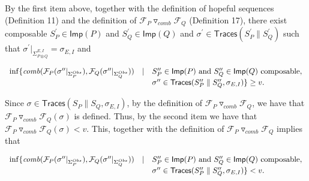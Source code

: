  
  
By the first item above, together with the definition of hopeful sequences (Definition 11) and the definition of ${{\mathcal{F}_{P}}\mathbin{\triangledown_{\mathit{comb}}}{\mathcal{F}_{Q}}}$ (Definition 17), there exist composable $S_{P}^{\prime}\in\mathsf{Imp}(P)$ and $S_{Q}^{\prime}\in\mathsf{Imp}(Q)$ and $\sigma^{\prime}\in\mathsf{Traces}(S_{P}^{\prime}\parallel S_{Q}^{\prime})$ such that $\sigma^{\prime}|_{\Sigma_{P\otimes Q}^{E,I}}=\sigma_{E,I}$ and\par
  
\par  \quad  \[\begin{array}[]{lll}\inf\{\mathit{comb}(\mathcal{F}_{P}(\sigma^{\prime\prime}|_{\Sigma_{P}^{Obs}}),\mathcal{F}_{Q}(\sigma^{\prime\prime}|_{\Sigma_{Q}^{Obs}}))&\mid&S_{P}^{\prime\prime}\in\mathsf{Imp}(P)\text{ and }S_{Q}^{\prime\prime}\in\mathsf{Imp}(Q)\text{ composable},\\
&&\sigma^{\prime\prime}\in\mathsf{Traces}(S_{P}^{\prime\prime}\parallel S_{Q}^{\prime\prime},\sigma_{E,I})\}\geq v.\end{array}\]\quad  \quad  
  
 
 
Since $\sigma\in\mathsf{Traces}(S_{P}\parallel S_{Q},\sigma_{E,I})$, by the definition of ${{\mathcal{F}_{P}}\mathbin{\triangledown_{\mathit{comb}}}{\mathcal{F}_{Q}}}$, we have that ${{\mathcal{F}_{P}}\mathbin{\triangledown_{\mathit{comb}}}{\mathcal{F}_{Q}}}(\sigma)$ is defined. Thus, by the second item we have that ${{\mathcal{F}_{P}}\mathbin{\triangledown_{\mathit{comb}}}{\mathcal{F}_{Q}}}(\sigma)<v$. This, together with the definition of ${{\mathcal{F}_{P}}\mathbin{\triangledown_{\mathit{comb}}}{\mathcal{F}_{Q}}}$ implies that\par
  
\par  \quad  \[\begin{array}[]{lll}\inf\{\mathit{comb}(\mathcal{F}_{P}(\sigma^{\prime\prime}|_{\Sigma_{P}^{Obs}}),\mathcal{F}_{Q}(\sigma^{\prime\prime}|_{\Sigma_{Q}^{Obs}}))&\mid&S_{P}^{\prime\prime}\in\mathsf{Imp}(P)\text{ and }S_{Q}^{\prime\prime}\in\mathsf{Imp}(Q)\text{ composable},\\
&&\sigma^{\prime\prime}\in\mathsf{Traces}(S_{P}^{\prime\prime}\parallel S_{Q}^{\prime\prime},\sigma_{E,I})\}<v.\end{array}\]\quad  \quad  
  
